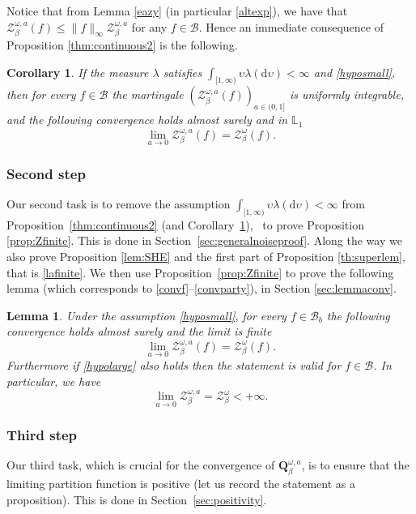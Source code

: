 \documentclass[10pt]{amsart}
\let\mathcal\mathscr
\newtheorem{lemma}[theorem]{Lemma}
\newtheorem{cor}[theorem]{Corollary}
\theoremstyle{definition}
\newcommand{\dd}{\mathrm{d}}
\newcommand{\cB}{{\ensuremath{\mathcal B}} }
\newcommand{\cZ}{{\ensuremath{\mathcal Z}} }
\newcommand{\bQ}{{\ensuremath{\mathbf Q}} }
\newcommand{\bbL}{{\ensuremath{\mathbb L}} }
\let\gl\lambda
\let\ups\upsilon
\let\go\omega
\begin{document}
 Notice that from Lemma \ref{eazy} (in particular \eqref{altexp}),
we have that
$\cZ^{\go,a }_{\beta}(f)\le \|f\|_{\infty} \cZ^{\go,a }_{\beta}$ for any $f\in \cB$. Hence an immediate consequence of
Proposition \ref{thm:continuous2} is the following.

\begin{cor}\label{toutlesf}
If the measure $\gl$ satisfies $\int_{[1,\infty)} \ups \gl(\dd \ups)<\infty$ and \eqref{hyposmall}, then for every $f\in \cB$ the martingale
$(\cZ^{\go,a }_{\beta}(f))_{a\in(0,1]}$ is uniformly integrable, and
the following convergence holds almost surely and in $\bbL_1$
\begin{equation*}
\lim_{a \to 0}\cZ^{\go,a }_{\beta}(f)=\cZ^{\go }_{ \beta}(f).
\end{equation*}
\end{cor}

\subsubsection*{Second step} Our second task is to remove the assumption $\int_{[1,\infty)} \ups \gl(\dd \ups)<\infty$ from Proposition~\ref{thm:continuous2} (and Corollary~\ref{toutlesf}), \ie \ to prove Proposition \ref{prop:Zfinite}. This is done in Section~\ref{sec:generalnoiseproof}. Along the way we also prove Proposition \ref{lem:SHE} and the first part of Proposition \ref{th:superlem}, that is \eqref{lafinite}.
We then use Proposition~\ref{prop:Zfinite} to prove the following lemma (which corresponds to \eqref{convf}--\eqref{convparty}), in Section \ref{sec:lemmaconv}.

\begin{lemma}\label{lemmaconv}
Under the assumption \eqref{hyposmall}, for every $f\in \cB_b$
the following convergence holds almost surely and the limit is finite
\begin{equation*}
\lim_{a \to 0}\cZ^{\go,a }_{\beta}(f)=\cZ^{\go }_{ \beta}(f).
\end{equation*}
Furthermore if \eqref{hypolarge} also holds then the statement is valid for $f\in \mathcal B$. In particular, we have
\begin{equation}
\label{eq:lemmaconv}
\lim_{a \to 0}\cZ^{\go,a }_{\beta}=\cZ^{\go }_{ \beta} <+\infty.
\end{equation}
\end{lemma}

\subsubsection*{Third step} Our third task, which is crucial for the convergence of $\bQ^{\go,a}_{\beta}$, is to ensure that the limiting partition function is positive (let us record the statement as a proposition).
This is done in Section~\ref{sec:positivity}.
\end{document}
